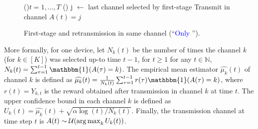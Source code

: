 \begin{figure}[h!]
	\centering
    \begin{framed}
	\begin{algorithm}[H]
		\For(){$t = 1, \dots, T$}{
			\Else(){
				j $\leftarrow$ last channel selected by first-stage \UCB\;
				Transmit in channel $A(t) = j$\;
			}
		}
		\caption[First-stage \UCB{} and retransmission in same channel.]{First-stage \UCB{} and retransmission in same channel (``\textcolor{blue}{Only \UCB{}}'').}
		\label{algo:43:UCB}
	\end{algorithm}
	\end{framed}
\end{figure}


More formally, for one device, let $N_k(t)$ be the number of times the channel $k$ (for $k\in [K]$) was selected up-to time $t-1$, for $t\geq1$
for any $t\in\mathbb{N}$,
$N_k(t) = \sum_{\tau=1}^{t-1} \mathbbm{1}(A(\tau) = k)$.
The empirical mean estimator $\widehat{\mu_k}(t)$ of channel $k$ is defined as $\widehat{\mu_k}(t) = \frac{1}{N_k(t)} \sum_{\tau=1}^{t-1} r(\tau) \mathbbm{1}(A(\tau) = k)$,
where $r(t)=Y_{k,t}$ is the reward obtained after transmission in channel $k$ at time $t$.
The upper confidence bound in each channel $k$ is defined as
$U_k(t) = \widehat{\mu_k}(t) + \sqrt{\alpha \log(t) / N_k(t)}$.
Finally, the transmission channel at time step $t$
is $A(t) \sim \mathcal{U}(\operatorname*{arg\,max}_k U_k(t))$.

